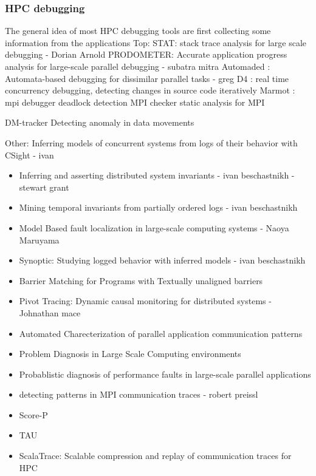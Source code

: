 

\subsubsection{HPC debugging}

The general idea of most HPC debugging tools are first collecting some information from the applications
Top:
STAT: stack trace analysis for large scale debugging - Dorian Arnold \cite{stat}
 PRODOMETER: Accurate application progress analysis for large-scale parallel debugging - subatra mitra \cite{prodometer}
 Automaded : Automata-based debugging for dissimilar parallel tasks - greg \cite{automaded-GBron}\cite{automaded-laguna}
 D4 : real time concurrency debugging, detecting changes in source code iteratively
Marmot : mpi debugger deadlock detection
MPI checker static analysis for MPI

DM-tracker Detecting anomaly in data movements 


Other: 
Inferring models of concurrent systems from logs of their behavior with CSight - ivan \cite{beschastnikh-csight}
\begin{itemize}
\item Inferring and asserting distributed system invariants -  ivan beschastnikh - stewart grant \cite{grant18}
\item Mining temporal invariants from partially ordered logs -  ivan beschastnikh \cite{beschastnikh-pologs}
\item Model Based fault localization in large-scale computing systems - Naoya Maruyama \cite{satoshi-08}
\item Synoptic: Studying logged behavior with inferred models - ivan beschastnikh \cite{beschastnikh-synoptic}
\item Barrier Matching for Programs with Textually unaligned barriers \cite{zhang07}
\item Pivot Tracing: Dynamic causal monitoring for distributed systems - Johnathan mace \cite{pivot}
\item Automated Charecterization of parallel application communication patterns \cite{roth-15}
\item Problem Diagnosis in Large Scale Computing environments \cite{miller06}
\item Probablistic diagnosis of performance faults in large-scale parallel applications \cite{laguna-12}
\item detecting patterns in MPI communication traces - robert preissl \cite{preissl-08}




\item Score-P \cite{scorep}
\item TAU \cite{tau}
\item ScalaTrace: Scalable compression and replay of communication traces for HPC  \cite{scalatrace}

\end{itemize}




